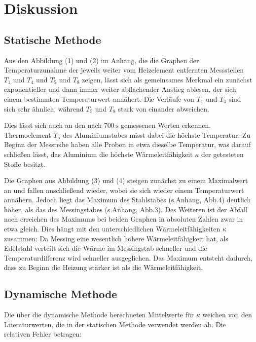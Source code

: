 
\section{Diskussion}
\label{sec:Diskussion}

\subsection{Statische Methode}

Aus den Abbildung (1) und (2) im Anhang, die die Graphen der Temperaturzunahme der jeweils weiter vom Heizelement entfernten Messstellen $T_\text{1}$ und $T_\text{4}$ und $T_\text{5}$ und $T_\text{8}$ zeigen, lässt sich als gemeinsames Merkmal ein zunächst exponentieller und dann immer weiter abflachender Anstieg ablesen, der sich einem bestimmten Temperaturwert annähert.
Die Verläufe von $T_\text{1}$ und $T_\text{4}$ sind sich sehr ähnlich, während $T_\text{5}$ und $T_\text{8}$ stark von einander abweichen.

Dies lässt sich auch an den nach $\SI{700}{\second}$ gemessenen Werten erkennen.
Thermoelement $T_\text{5}$ des Aluminiumstabes misst dabei die höchste Temperatur.
Zu Beginn der Messreihe haben alle Proben in etwa dieselbe Temperatur, was darauf schließen lässt, das Aluminium die höchste Wärmeleitfähigkeit $\kappa$ der getesteten Stoffe besitzt.

Die Graphen aus Abbildung (3) und (4) steigen zunächst zu einem Maximalwert an und fallen anschließend wieder, wobei sie sich wieder einem Temperaturwert annähern.
Jedoch liegt das Maximum des Stahlstabes (s.Anhang, Abb.4)
deutlich höher, als das des Messingstabes (s.Anhang, Abb.3).
Des Weiteren ist der Abfall nach erreichen des Maximums bei beiden Graphen in absoluten Zahlen zwar in etwa gleich.
Dies hängt mit den unterschiedlichen Wärmeleitfähigkeiten $\kappa$ zusammen:
Da Messing eine wesentlich höhere Wärmeleitfähigkeit hat, als Edelstahl verteilt sich die Wärme im Messingstab schneller und die Temperaturdifferenz wird schneller ausgeglichen.
Das Maximum entsteht dadurch, dass zu Beginn die Heizung stärker ist als die Wärmeleitfähigkeit.

\subsection{Dynamische Methode}

Die über die dynamische Methode berechneten Mittelwerte für $\kappa$ weichen von den Literaturwerten, die in der statischen Methode verwendet werden ab. Die relativen Fehler betragen:

